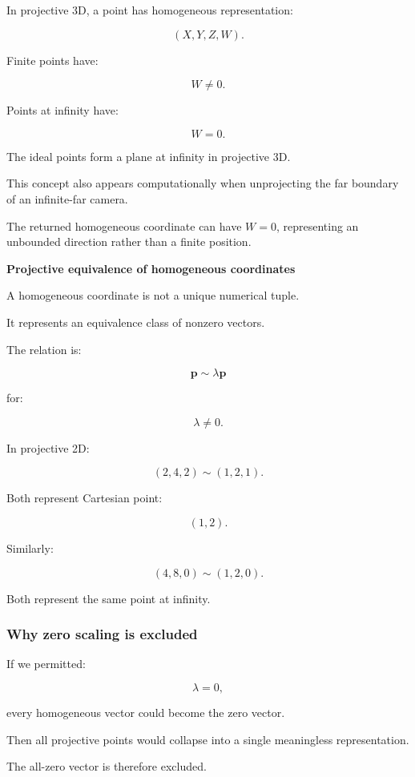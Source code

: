 In projective 3D, a point has homogeneous representation:

\[
 \boxed{ (X,Y,Z,W) }.
\]

Finite points have:

\[
 W\ne0.
\]

Points at infinity have:

\[
 \boxed{W=0}.
\]

The ideal points form a plane at infinity in projective 3D.

This concept also appears computationally when unprojecting the far boundary of an infinite-far camera.

The returned homogeneous coordinate can have \(W=0\), representing an unbounded direction rather than a finite position.

\textbf{Projective equivalence of homogeneous coordinates}

A homogeneous coordinate is not a unique numerical tuple.

It represents an equivalence class of nonzero vectors.

The relation is:

\[
 \boxed{ \mathbf p\sim\lambda\mathbf p }
\]

for:

\[
 \lambda\ne0.
\]

In projective 2D:

\[
 (2,4,2)\sim(1,2,1).
\]

Both represent Cartesian point:

\[
 (1,2).
\]

Similarly:

\[
 (4,8,0)\sim(1,2,0).
\]

Both represent the same point at infinity.

\subsubsection{Why zero scaling is excluded}\label{02-foundations-ii-ch032-why-zero-scaling-is-excluded}

\hypertarget{02-foundations-ii-ch032-why-zero-scaling-is-excluded}{}

If we permitted:

\[
 \lambda=0,
\]

every homogeneous vector could become the zero vector.

Then all projective points would collapse into a single meaningless representation.

The all-zero vector is therefore excluded.

